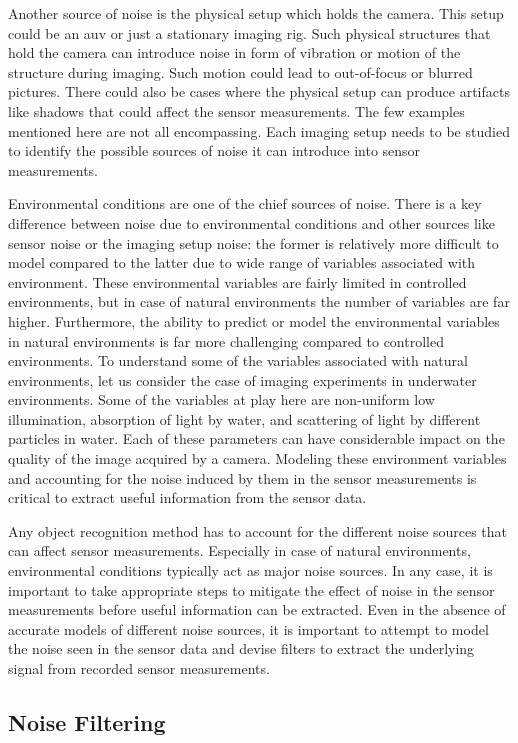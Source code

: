 Another source of noise is the physical setup which holds the camera. This setup could be an \gls{auv} or just a stationary imaging rig. Such physical structures that hold the camera can introduce noise in form of vibration or motion of the structure during imaging. Such motion could lead to out-of-focus or blurred pictures. There could also be cases where the physical setup can produce artifacts like shadows that could affect the sensor measurements. The few examples mentioned here are not all encompassing. Each imaging setup needs to be studied to identify the possible sources of noise it can introduce into sensor measurements.

Environmental conditions are one of the chief sources of noise. 
There is a key difference between noise due to environmental conditions 
and other sources like sensor noise or the imaging setup noise: the former is relatively more difficult to model compared to the latter due to wide range of variables associated with environment. 
These environmental variables are fairly limited in controlled environments, but in case of natural environments
the number of variables are far higher. Furthermore, the ability to predict or model the environmental variables in natural
environments is far more challenging compared to controlled environments. To understand some of the variables associated with natural environments, let us consider the case of imaging experiments in underwater environments. 
Some of the variables at play here are non-uniform low illumination, absorption of light by water,
and scattering of light by different particles in water. Each of these parameters can have considerable impact on the quality of the image acquired by
a camera. Modeling these environment variables and accounting for the noise induced by them in the sensor measurements is critical to extract useful
information from the sensor data.

Any object recognition method has to account for the different noise sources that can affect sensor measurements. Especially in case of natural environments, environmental conditions typically act as major noise sources. 
In any case, it is important to take appropriate steps to mitigate the effect of noise 
in the sensor measurements before useful information can be extracted. 
Even in the absence of accurate models of different noise sources, it is important to attempt to model the noise seen in the sensor data
and devise filters to extract the underlying signal from recorded sensor measurements.

\subsection{Noise Filtering}
\label{sec:noise_filters}

